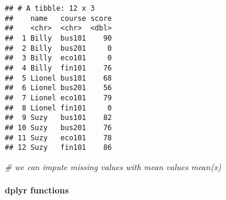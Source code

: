 \documentclass[
]{article}
\newenvironment{Shaded}{\begin{snugshade}}{\end{snugshade}}
\newcommand{\CommentTok}[1]{\textcolor[rgb]{0.56,0.35,0.01}{\textit{#1}}}
\begin{document}
\begin{verbatim}
## # A tibble: 12 x 3
##    name   course score
##    <chr>  <chr>  <dbl>
##  1 Billy  bus101    90
##  2 Billy  bus201     0
##  3 Billy  eco101     0
##  4 Billy  fin101    76
##  5 Lionel bus101    68
##  6 Lionel bus201    56
##  7 Lionel eco101    79
##  8 Lionel fin101     0
##  9 Suzy   bus101    82
## 10 Suzy   bus201    76
## 11 Suzy   eco101    78
## 12 Suzy   fin101    86
\end{verbatim}

\begin{Shaded}
\begin{Highlighting}[]
\CommentTok{\# we can impute missing values with mean values mean(x)}
\end{Highlighting}
\end{Shaded}

\hypertarget{dplyr-functions}{%
\paragraph{dplyr functions}\label{dplyr-functions}}
\end{document}
